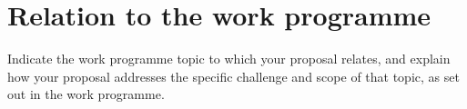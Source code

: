\section{Relation to the work programme}

Indicate the work programme topic to which your proposal relates, and explain how your proposal addresses the specific challenge and scope of that topic, as set out in the work programme.

  
